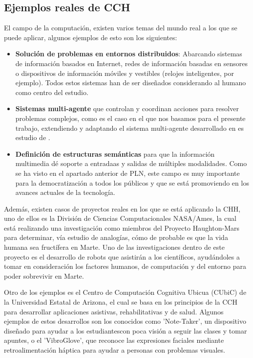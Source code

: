 \subsection{Ejemplos reales de CCH }

El campo de la computación, existen varios temas del mundo real a los que se puede aplicar, algunos ejemplos de esto son los siguientes:

\begin{itemize}
	\item \textbf{Solución de problemas en entornos distribuidos}: Abarcando sistemas de información basados en Internet, redes de información basadas en sensores o dispositivos de información móviles y vestibles (relojes inteligentes, por ejemplo). Todos estos sistemas han de ser diseñados considerando al humano como centro del estudio.
	
	\item \textbf{Sistemas multi-agente} que controlan y coordinan acciones para resolver problemas complejos, como es el caso en el que nos basamos para el presente trabajo, extendiendo y adaptando el sistema multi-agente desarrollado en es estudio de \cite{park2023generative}.
	
	\item \textbf{Definición de estructuras semánticas} para que la información multimedia dé soporte a entradaas y salidas de múltiples modalidades. Como se ha visto en el apartado anterior de PLN, este campo es muy importante para la democratización a todos los públicos y que se está promoviendo en los avances actuales de la tecnología.
	
\end{itemize}

Además, existen casos de proyectos reales en los que se está aplicando la CHH, uno de ellos es la División de Ciencias Computacionales NASA/Ames, la cual está realizando una investigación como miembros del Proyecto Haughton-Mars para determinar, vía estudio de analogías, cómo de probable es que la vida humana sea fructífera en Marte. Uno de las investigaciones dentro de este proyecto es el desarrollo de robots que asistirán a los científicos, ayudándoles a tomar en consideración los factores humanos, de computación y del entorno para poder sobrevivir en Marte.

Otro de los ejemplos es el Centro de Computación Cognitiva Ubicua (CUbiC) de la Universidad Estatal de Arizona, el cual se basa en los principios de la CCH para desarrollar aplicaciones asistivas, rehabilitativas y de salud. Algunos ejemplos de estos desarrollos son los conocidos como 'Note-Taker', un dispositivo diseñado para ayudar a los estudiantescon poca visión a seguir las clases y tomar apuntes, o el 'VibroGlove', que reconoce las expresiones faciales mediante retroalimentación háptica para ayudar a personas con problemas visuales.

